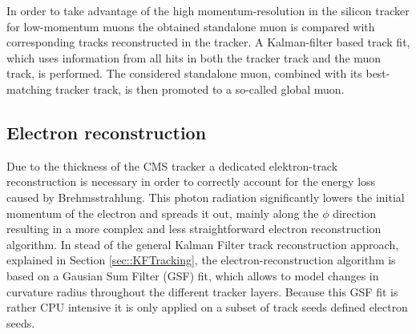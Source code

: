 In order to take advantage of the high momentum-resolution in the silicon tracker for low-momentum muons the obtained standalone muon is compared with corresponding tracks reconstructed in the tracker.
A Kalman-filter based track fit, which uses information from all hits in both the tracker track and the muon track, is performed. The considered standalone muon, combined with its best-matching tracker track, is then promoted to a so-called global muon. 
 

\subsection{Electron reconstruction} \label{subsec::Electron}

Due to the thickness of the CMS tracker a dedicated elektron-track reconstruction is necessary in order to correctly account for the energy loss caused by Brehmsstrahlung. 
This photon radiation significantly lowers the initial momentum of the electron and spreads it out, mainly along the $\phi$ direction resulting in a more complex and less straightforward electron reconstruction algorithm.
In stead of the general Kalman Filter track reconstruction approach, explained in Section \ref{sec::KFTracking}, the electron-reconstruction algorithm is based on a Gausian Sum Filter (GSF) fit, which allows to model changes in curvature radius throughout the different tracker layers. Because this GSF fit is rather CPU intensive it is only applied on a subset of track seeds defined electron seeds.


